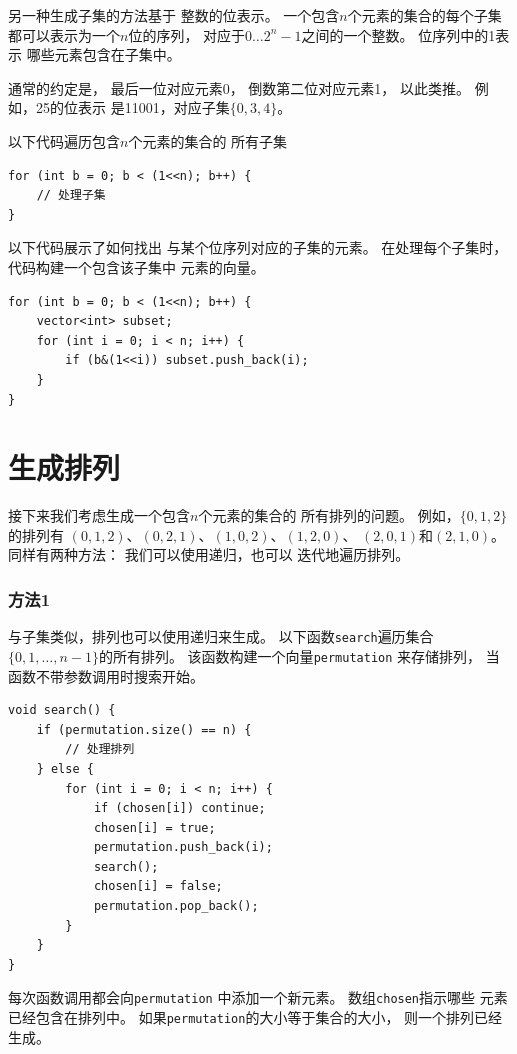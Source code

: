 另一种生成子集的方法基于
整数的位表示。
一个包含$n$个元素的集合的每个子集
都可以表示为一个$n$位的序列，
对应于$0 \ldots 2^n-1$之间的一个整数。
位序列中的1表示
哪些元素包含在子集中。

通常的约定是，
最后一位对应元素0，
倒数第二位对应元素1，
以此类推。
例如，25的位表示
是11001，对应子集$\{0,3,4\}$。

以下代码遍历包含$n$个元素的集合的
所有子集

\begin{lstlisting}
for (int b = 0; b < (1<<n); b++) {
    // 处理子集
}
\end{lstlisting}

以下代码展示了如何找出
与某个位序列对应的子集的元素。
在处理每个子集时，
代码构建一个包含该子集中
元素的向量。

\begin{lstlisting}
for (int b = 0; b < (1<<n); b++) {
    vector<int> subset;
    for (int i = 0; i < n; i++) {
        if (b&(1<<i)) subset.push_back(i);
    }
}
\end{lstlisting}

\section{生成排列}


接下来我们考虑生成一个包含$n$个元素的集合的
所有排列的问题。
例如，$\{0,1,2\}$的排列有
$(0,1,2)$、$(0,2,1)$、$(1,0,2)$、$(1,2,0)$、
$(2,0,1)$和$(2,1,0)$。
同样有两种方法：
我们可以使用递归，也可以
迭代地遍历排列。

\subsubsection{方法1}

与子集类似，排列也可以使用递归来生成。
以下函数\texttt{search}遍历集合$\{0,1,\ldots,n-1\}$的所有排列。
该函数构建一个向量\texttt{permutation}
来存储排列，
当函数不带参数调用时搜索开始。

\begin{lstlisting}
void search() {
    if (permutation.size() == n) {
        // 处理排列
    } else {
        for (int i = 0; i < n; i++) {
            if (chosen[i]) continue;
            chosen[i] = true;
            permutation.push_back(i);
            search();
            chosen[i] = false;
            permutation.pop_back();
        }
    }
}
\end{lstlisting}

每次函数调用都会向\texttt{permutation}
中添加一个新元素。
数组\texttt{chosen}指示哪些
元素已经包含在排列中。
如果\texttt{permutation}的大小等于集合的大小，
则一个排列已经生成。

